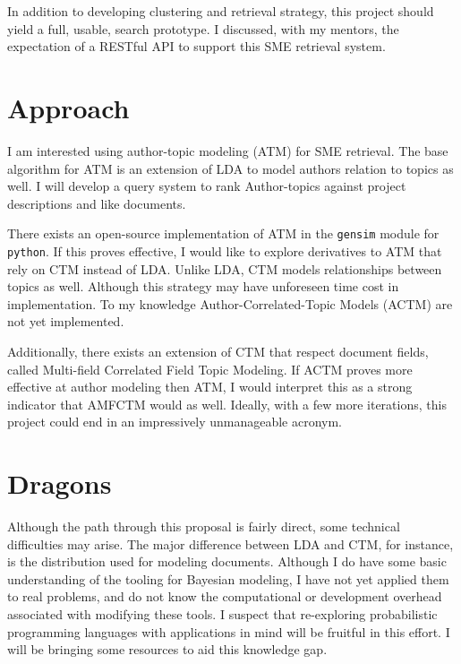 \documentclass{article}
\begin{document}
\begin{multicols}{2}
In addition to developing clustering and retrieval strategy, this project should yield
a full, usable, search prototype. I discussed, with my mentors, the expectation of a
RESTful API to support this SME retrieval system.

\section{Approach}

I am interested using author-topic\cite{Rosen-Zvi2004} modeling (ATM) for
SME retrieval. The base algorithm for ATM is an
extension of LDA to model authors relation to topics as well. I will develop
a query system to rank Author-topics against project
descriptions and like documents.

There exists an open-source implementation of ATM in the \texttt{gensim}\cite{rehurek_lrec}
module for \texttt{python}. If this proves effective, I would like to explore
derivatives to ATM that rely on CTM instead of LDA. Unlike LDA, CTM models
relationships between topics as well. Although this strategy may have unforeseen time
cost in implementation. To my knowledge Author-Correlated-Topic Models (ACTM) are
not yet implemented.

Additionally, there exists an extension of CTM that respect document fields, called
Multi-field Correlated Field Topic Modeling\cite{Salomatin2009MultifieldCT}. If ACTM
proves more effective at author modeling then ATM, I would interpret this as a strong
indicator that AMFCTM would as well. Ideally, with a few more iterations, this
project could end in an impressively unmanageable acronym.

\section{Dragons}

Although the path through this proposal is fairly direct, some technical difficulties may arise.
The major difference between LDA and CTM, for instance, is the distribution used for modeling
documents. Although I do have some basic understanding of the tooling for Bayesian modeling,
I have not yet applied them to real problems, and do not know the computational or development
overhead associated with modifying these tools. I suspect that re-exploring probabilistic
programming languages with applications in mind will be fruitful in this effort.
I will be bringing some resources\cite{lambert2018} to aid this knowledge gap.


\end{multicols}
\end{document}
